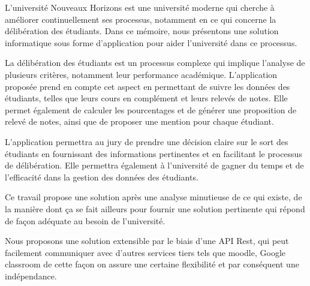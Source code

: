 L'université Nouveaux Horizons est une université moderne qui cherche à améliorer continuellement ses processus, notamment en ce qui concerne la délibération des étudiants. Dans ce mémoire, nous présentons une solution informatique sous forme d'application pour aider l'université dans ce processus.

La délibération des étudiants est un processus complexe qui implique l'analyse de plusieurs critères, notamment leur performance académique. L'application proposée prend en compte cet aspect en permettant de suivre les données des étudiants, telles que leurs cours en complément et leurs relevés de notes. Elle permet également de calculer les pourcentages et de générer une proposition de relevé de notes, ainsi que de proposer une mention pour chaque étudiant.

L'application permettra au jury de prendre une décision claire sur le sort des étudiants en fournissant des informations pertinentes et en facilitant le processus de délibération. Elle permettra également à l'université de gagner du temps et de l'efficacité dans la gestion des données des étudiants.

Ce travail propose une solution après une analyse minutieuse de ce qui existe, de la manière dont ça se fait ailleurs pour fournir une solution pertinente qui répond de façon adéquate au besoin de l'université.

Nous proposons une solution extensible par le biais d'une API Rest, qui peut facilement communiquer avec d'autres services tiers tels que moodle, Google classroom de cette façon on assure une certaine flexibilité et par conséquent une indépendance.